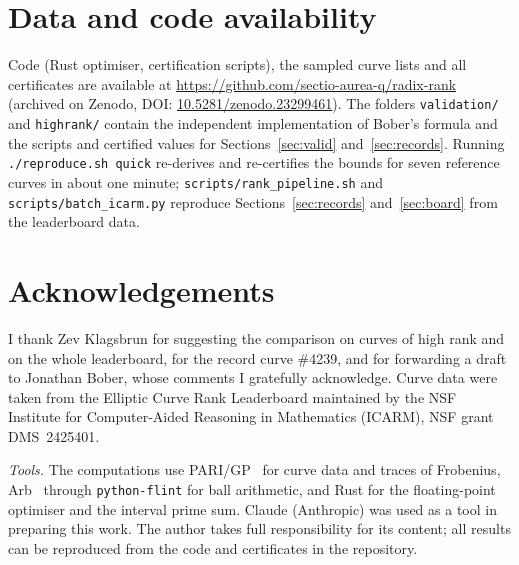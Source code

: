 \documentclass[11pt]{amsart}
\theoremstyle{remark}
\theoremstyle{definition}
\begin{document}
\section*{Data and code availability}
Code (Rust optimiser, certification scripts), the sampled curve lists and all certificates are available at \url{https://github.com/sectio-aurea-q/radix-rank} (archived on Zenodo, DOI: \href{https://doi.org/10.5281/zenodo.23299461}{10.5281/zenodo.23299461}). The folders \texttt{validation/} and \texttt{highrank/} contain the independent implementation of Bober's formula and the scripts and certified values for Sections~\ref{sec:valid} and~\ref{sec:records}. Running \texttt{./reproduce.sh quick} re-derives and re-certifies the bounds for seven reference curves in about one minute; \texttt{scripts/rank\_pipeline.sh} and \texttt{scripts/batch\_icarm.py} reproduce Sections~\ref{sec:records} and~\ref{sec:board} from the leaderboard data.

\section*{Acknowledgements}
I thank Zev Klagsbrun for suggesting the comparison on curves of high rank and on the whole leaderboard, for the record curve \#4239, and for forwarding a draft to Jonathan Bober, whose comments I gratefully acknowledge. Curve data were taken from the Elliptic Curve Rank Leaderboard maintained by the NSF Institute
for Computer-Aided Reasoning in Mathematics (ICARM), NSF grant DMS~2425401.

\medskip
\noindent\emph{Tools.} The computations use PARI/GP~\cite{PARI} for curve data and traces of
Frobenius, Arb~\cite{Arb} through \texttt{python-flint} for ball arithmetic, and Rust for the
floating-point optimiser and the interval prime sum. Claude (Anthropic) was used as a tool in
preparing this work. The author takes full responsibility for its content; all results can be
reproduced from the code and certificates in the repository.
\end{document}
